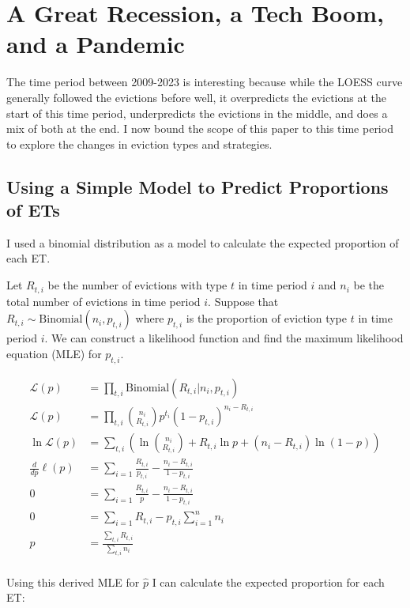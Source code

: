 \documentclass{article}\usepackage[]{graphicx}\usepackage[]{xcolor}
\begin{document}
\section{A Great Recession, a Tech Boom, and a Pandemic}
The time period between 2009-2023 is interesting because while the LOESS curve generally followed the evictions before well, it overpredicts the evictions at the start of this time period, underpredicts the evictions in the middle, and does a mix of both at the end. I now bound the scope of this paper to this time period to explore the changes in eviction types and strategies.

\subsection{Using a Simple Model to Predict Proportions of ETs}

I used a binomial distribution as a model to calculate the expected proportion of each ET.

Let $R_{t,i}$ be the number of evictions with type $t$ in time period $i$ and $n_i$ be the total number of evictions in time period $i$. Suppose that $R_{t,i} \sim \mathrm{Binomial}(n_i, p_{t,i})$ where $p_{t,i}$ is the proportion of eviction type $t$ in time period $i$. We can construct a likelihood function and find the maximum likelihood equation (MLE) for $p_{t,i}$.

\begin{align*}
    \mathcal{L}(p) &= \prod_{t, i} {\mathrm{Binomial}(R_{t,i} | n_i , p_{t,i})} \\
    \mathcal{L}(p) &= \prod_{t, i} {n_i \choose R_{t, i}} p^{t_i}(1-p_{t,i})^{n_i-R_{t, i}} \\
    \ln\mathcal{L}(p) &= \sum_{t,i} \left( \ln{n_i \choose R_{t, i}} + R_{t, i} \ln p + (n_i-R_{t, i}) \ln (1-p) \right) \\
    \frac{d}{dp} \ell(p) &= \sum_{i=1} \frac{R_{t, i}}{p_{t,i}} - \frac{n_i - R_{t, i}}{1-p_{t,i}} \\
    0 &= \sum_{i=1} \frac{R_{t, i}}{p} - \frac{n_i - R_{t, i}}{1-p_{t,i}} \\
    0 &= \sum_{i=1} R_{t, i} - p_{t,i}\sum_{i=1}^{n} n_i \\
    p &= \frac{\sum_{t, i} R_{t, i}}{\sum_{t, i} n_i} \\
\end{align*}

Using this derived MLE for $\hat{p}$ I can calculate the expected proportion for each ET:
\end{document}
